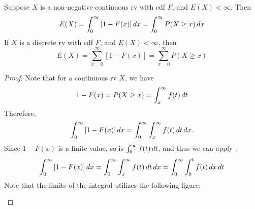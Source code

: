 \documentclass[notoc,notitlepage]{tufte-book}
\begin{document}
\begin{thm}
\label{thm:expectation_from_the_cdf}
  Suppose $X$ is a non-negative continuous rv with cdf $F$, and $E(X) < \infty$. Then
  \begin{equation}\label{eq:cont_cdf_to_expectation}
    E(X) = \int_{0}^{\infty} \left[ 1 - F(x) \right] \mathop{}\!d{x} = \int_{0}^{\infty} P(X \geq x) \mathop{}\!d{x}
  \end{equation}
  If $X$ is a discrete rv with cdf $F$, and $E(X) < \infty$, then
  \begin{equation}\label{eq:discrete_cdf_to_expectation}
    E(X) = \sum_{x = 0}^{\infty} \left[ 1 - F(x) \right] = \sum_{x = 0}^{\infty} P(X \geq x)
  \end{equation}
\end{thm}

\begin{proof}
  Note that for a continuous rv $X$, we have
  \begin{equation*}
    1 - F(x) = P(X \geq x) = \int_{x}^{\infty} f(t) \mathop{}\!d{t}
  \end{equation*}
  Therefore,
  \begin{equation*}
    \int_{0}^{\infty} \left[ 1 - F(x) \right] \mathop{}\!d{x} = \int_{0}^{\infty} \int_{x}^{\infty} f(t) \mathop{}\!d{t} \mathop{}\!d{x}.
  \end{equation*}
  Since $1 - F(x)$ is a finite value, so is $\int_{0}^{\infty} f(t) \mathop{}\!d{t}$, and thus we can apply :
  \begin{equation*}
    \int_{0}^{\infty} \left[ 1 - F(x) \right] \mathop{}\!d{x} = \int_{0}^{\infty} \int_{x}^{\infty} f(t) \mathop{}\!d{t} \mathop{}\!d{x} = \int_{0}^{\infty} \int_{0}^{t} f(t) \mathop{}\!d{x} \mathop{}\!d{t}     
  \end{equation*}
  Note that the limits of the integral utilizes the following figure:
	\begin{center}
	\end{center}

\end{proof}
\end{document}
